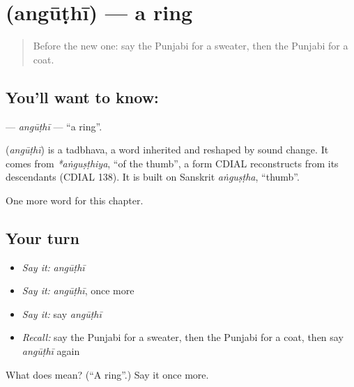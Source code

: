 \section[\texorpdfstring{\pa{ਅੰਗੂਠੀ} (angūṭhī)}{ਅੰਗੂਠੀ (angūṭhī)}]{ (angūṭhī) — a ring}

\label{lesson:PA-C120-anguthi}



\begin{quote}
Before the new one: say the Punjabi for a sweater, then the Punjabi for a coat.
\end{quote}

\subsection*{You'll want to know: }
\textbf{} — \emph{angūṭhī} — \textquotedblleft{}a ring\textquotedblright{}.

\begin{cousinweb}
\textbf{} (\emph{angūṭhī}) is a tadbhava, a word inherited and reshaped by sound change. It comes from \emph{*aṅguṣṭhiya}, \textquotedblleft{}of the thumb\textquotedblright{}, a form CDIAL reconstructs from its descendants (CDIAL 138). It is built on Sanskrit \emph{aṅguṣṭha}, \textquotedblleft{}thumb\textquotedblright{}.
\end{cousinweb}

\begin{grammarlens}[title={What you've built}]
One more word for this chapter.
\end{grammarlens}

\subsection*{Your turn}
\begin{itemize}
\raggedright
  \item \emph{Say it:} \emph{angūṭhī}
  \item \emph{Say it:} \emph{angūṭhī}, once more
  \item \emph{Say it:} say \emph{angūṭhī}
  \item \emph{Recall:} say the Punjabi for a sweater, then the Punjabi for a coat, then say \emph{angūṭhī} again
\end{itemize}

\begin{tcolorbox}[breakable,colback=teal!4,colframe=teal!35!black,title={Before you move on}]
What does  mean? (\textquotedblleft{}A ring\textquotedblright{}.) Say it once more.
\end{tcolorbox}
